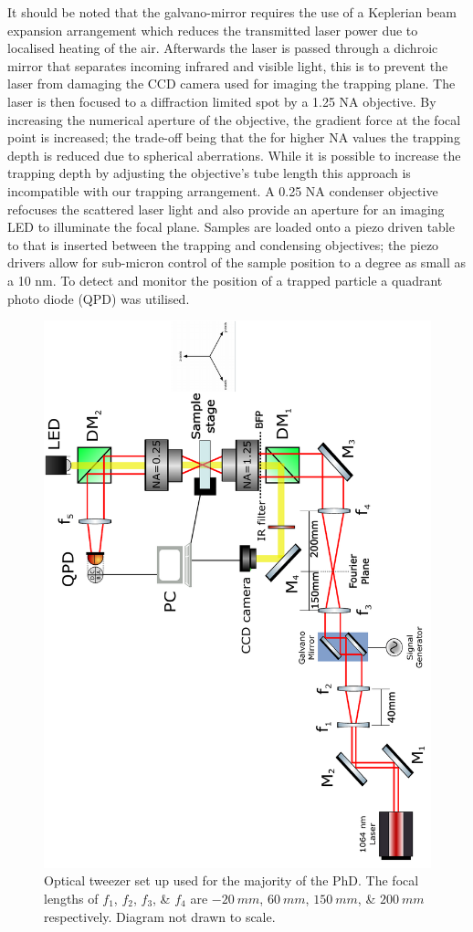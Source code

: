 It should be noted that the galvano-mirror requires the use 
of a Keplerian beam expansion arrangement which reduces
the transmitted laser power due to localised heating of the air.
Afterwards the laser is passed through a dichroic mirror that 
separates incoming infrared and visible light, this is to 
prevent the laser from damaging the CCD camera used for imaging
the trapping plane. The laser is then focused to a diffraction
limited spot by a 1.25 NA objective. By increasing the numerical
aperture of the objective, the gradient force at the focal point 
is increased; the trade-off being that the for higher NA values 
the trapping depth is reduced due to spherical aberrations.
While it is possible to increase the trapping depth \cite{Reihani2006} 
by adjusting the objective's tube length this approach is incompatible 
with our trapping arrangement. A 0.25 NA condenser objective refocuses
the scattered laser light and also provide an aperture for an 
imaging LED to illuminate the focal plane. Samples are loaded 
onto a piezo driven table to that is inserted between the trapping
and condensing objectives; the piezo drivers allow for sub-micron
control of the sample position to a degree as small as a 10 nm. 
To detect and monitor the position of a trapped particle a 
quadrant photo diode (QPD) was utilised. 
\begin{figure}[h!]
	\centering
	\includegraphics[height=\linewidth, angle=270]{tweezer_setup.pdf}
	\caption{Optical tweezer set up used for the majority of the PhD. The focal lengths of $f_1$, $f_2$, $f_3$, \& $f_4$ are $-20\ mm$, $60\ mm$, $150\ mm$, \& $200\ mm$ respectively. Diagram not drawn to scale.}
	\label{fig:setup}
\end{figure}

